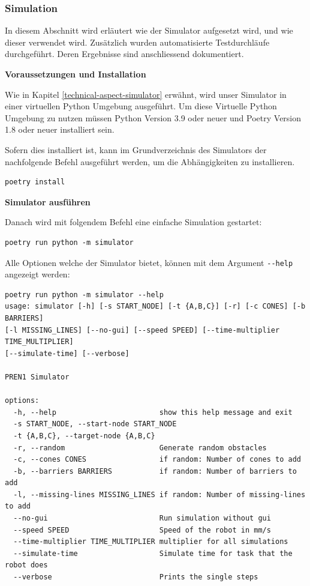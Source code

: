 \subsubsection{Simulation}

In diesem Abschnitt wird erläutert wie der Simulator aufgesetzt wird, und wie dieser verwendet wird. Zusätzlich wurden automatisierte Testdurchläufe durchgeführt. Deren Ergebnisse sind anschliessend dokumentiert.

\textbf{Voraussetzungen und Installation}

Wie in Kapitel \ref{technical-aspect-simulator} erwähnt, wird unser Simulator in einer virtuellen Python Umgebung ausgeführt. Um diese Virtuelle Python Umgebung zu nutzen müssen Python Version 3.9 oder neuer und Poetry Version 1.8 oder neuer installiert sein.

Sofern dies installiert ist, kann im Grundverzeichnis des Simulators der nachfolgende Befehl ausgeführt werden, um die Abhängigkeiten zu installieren.

\begin{verbatim}
poetry install
\end{verbatim}

\textbf{Simulator ausführen}

Danach wird mit folgendem Befehl eine einfache Simulation gestartet:

\begin{verbatim}
poetry run python -m simulator
\end{verbatim}

Alle Optionen welche der Simulator bietet, können mit dem Argument \verb|--help| angezeigt werden:

\begin{footnotesize}
\begin{verbatim}
poetry run python -m simulator --help
usage: simulator [-h] [-s START_NODE] [-t {A,B,C}] [-r] [-c CONES] [-b BARRIERS] 
[-l MISSING_LINES] [--no-gui] [--speed SPEED] [--time-multiplier TIME_MULTIPLIER] 
[--simulate-time] [--verbose]

PREN1 Simulator

options:
  -h, --help                        show this help message and exit
  -s START_NODE, --start-node START_NODE
  -t {A,B,C}, --target-node {A,B,C}
  -r, --random                      Generate random obstacles
  -c, --cones CONES                 if random: Number of cones to add
  -b, --barriers BARRIERS           if random: Number of barriers to add
  -l, --missing-lines MISSING_LINES if random: Number of missing-lines to add
  --no-gui                          Run simulation without gui
  --speed SPEED                     Speed of the robot in mm/s
  --time-multiplier TIME_MULTIPLIER multiplier for all simulations
  --simulate-time                   Simulate time for task that the robot does
  --verbose                         Prints the single steps
\end{verbatim}
\end{footnotesize}

